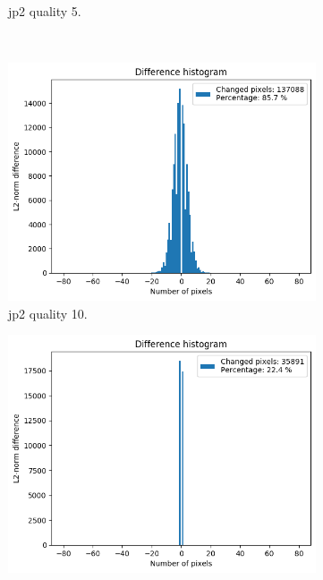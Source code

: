 \begin{figure}[htb]
\begin{subfigure}[b]{0.49\textwidth}
            \caption{\gls{jp2} quality 5.}
            \label{fig:img_quality_center_histogram_5}
        \end{subfigure}
        \\
        \begin{subfigure}[b]{0.49\textwidth}
            \centering
            \includegraphics[width=\textwidth]{doc/thesis/0_figures/compare_quality/set1/histograms/jp2_10_center_diff_histogram.png}
            \caption{\gls{jp2} quality 10.}
            \label{fig:img_quality_center_histogram_10}
        \end{subfigure}
        \begin{subfigure}[b]{0.49\textwidth}
            \centering
            \includegraphics[width=\textwidth]{doc/thesis/0_figures/compare_quality/set1/histograms/jp2_100_center_diff_histogram.png}

\end{subfigure}
\end{figure}
